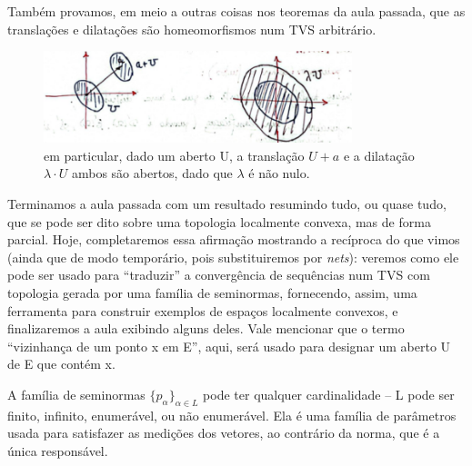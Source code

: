 \documentclass[../distribution_theory_notes.tex]{subfiles}
\begin{document}
   Também provamos, em meio a outras coisas nos teoremas da aula passada, que as translações e dilatações são homeomorfismos num TVS arbitrário.
   \begin{figure}[H]
   \begin{center}
   \includegraphics[height=0.8\textheight, width=0.8\textwidth, keepaspectratio]{./Images/trans_dilation_03.png}
   \end{center}
   \caption{em particular, dado um aberto U, a translação \(U+a\) e a dilatação \(\lambda \cdot U\) ambos são abertos, dado que \(\lambda \) é não nulo.}
   \end{figure}

   Terminamos a aula passada com um resultado resumindo tudo, ou quase tudo, que se pode ser dito sobre uma topologia localmente convexa, mas de forma parcial. Hoje, completaremos essa afirmação mostrando a recíproca do que vimos (ainda que de modo temporário, pois substituiremos por \textit{nets}): veremos como ele pode ser usado para ``traduzir'' a convergência de sequências num TVS com topologia gerada por uma família de seminormas, fornecendo, assim, uma ferramenta para construir exemplos de espaços localmente convexos, e finalizaremos a aula exibindo alguns deles. Vale mencionar que o termo ``vizinhança de um ponto x em E'', aqui, será usado para designar um aberto U de E que contém x.

     \begin{tcolorbox}[
     skin=enhanced,
     title=Observação,
     fonttitle=\bfseries,
   colframe=black,
     colbacktitle=cyan!75!white, 
     colback=cyan!15,
     colbacklower=black,
   coltitle=black,
     drop fuzzy shadow,
     ]
     A família de seminormas \(\{p_{\alpha }\}_{\alpha \in L}\) pode ter qualquer cardinalidade -- L pode ser finito, infinito, enumerável, ou não enumerável. Ela é uma família de parâmetros usada para satisfazer as medições dos vetores, ao contrário da norma, que é a única responsável.
     \end{tcolorbox}
\end{document}
